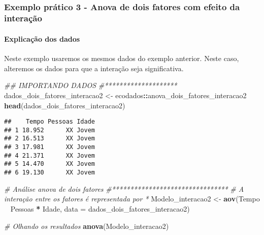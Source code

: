 \documentclass[
]{book}
\newenvironment{Shaded}{\begin{snugshade}}{\end{snugshade}}
\newcommand{\CommentTok}[1]{\textcolor[rgb]{0.56,0.35,0.01}{\textit{#1}}}
\newcommand{\DataTypeTok}[1]{\textcolor[rgb]{0.13,0.29,0.53}{#1}}
\newcommand{\KeywordTok}[1]{\textcolor[rgb]{0.13,0.29,0.53}{\textbf{#1}}}
\newcommand{\NormalTok}[1]{#1}
\newcommand{\OperatorTok}[1]{\textcolor[rgb]{0.81,0.36,0.00}{\textbf{#1}}}
\newcommand{\StringTok}[1]{\textcolor[rgb]{0.31,0.60,0.02}{#1}}
\begin{document}
~

\hypertarget{exemplo-pruxe1tico-3---anova-de-dois-fatores-com-efeito-da-interauxe7uxe3o}{%
\subsubsection{Exemplo prático 3 - Anova de dois fatores com efeito da interação}\label{exemplo-pruxe1tico-3---anova-de-dois-fatores-com-efeito-da-interauxe7uxe3o}}

\hypertarget{explicauxe7uxe3o-dos-dados-9}{%
\paragraph{Explicação dos dados}\label{explicauxe7uxe3o-dos-dados-9}}

Neste exemplo usaremos os mesmos dados do exemplo anterior. Neste caso, alteremos os dados para que a interação seja significativa.

\begin{Shaded}
\begin{Highlighting}[]
\CommentTok{## IMPORTANDO DADOS}
\CommentTok{#********************}
\NormalTok{dados_dois_fatores_interacao2 <-}\StringTok{ }\NormalTok{ecodados}\OperatorTok{::}\NormalTok{anova_dois_fatores_interacao2}
\KeywordTok{head}\NormalTok{(dados_dois_fatores_interacao2)}
\end{Highlighting}
\end{Shaded}

\begin{verbatim}
##    Tempo Pessoas Idade
## 1 18.952      XX Jovem
## 2 16.513      XX Jovem
## 3 17.981      XX Jovem
## 4 21.371      XX Jovem
## 5 14.470      XX Jovem
## 6 19.130      XX Jovem
\end{verbatim}

\begin{Shaded}
\begin{Highlighting}[]
\CommentTok{# Análise anova de dois fatores }
\CommentTok{#********************************}
\CommentTok{# A interação entre os fatores é representada por *}
\NormalTok{Modelo_interacao2 <-}\StringTok{ }\KeywordTok{aov}\NormalTok{(Tempo }\OperatorTok{~}\StringTok{ }\NormalTok{Pessoas }\OperatorTok{*}\StringTok{ }\NormalTok{Idade, }\DataTypeTok{data =}\NormalTok{ dados_dois_fatores_interacao2)}

\CommentTok{# Olhando os resultados}
\KeywordTok{anova}\NormalTok{(Modelo_interacao2)}
\end{Highlighting}
\end{Shaded}
\end{document}
